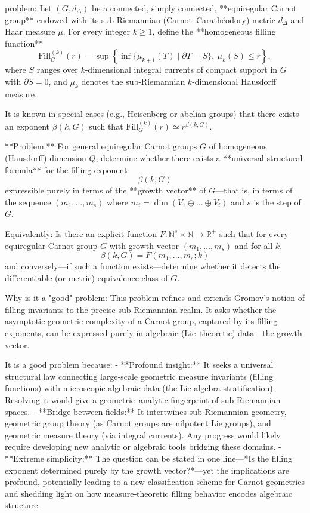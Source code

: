 problem:  
Let \((G, d_{\Delta})\) be a connected, simply connected, **equiregular Carnot group** endowed with its sub‑Riemannian (Carnot–Carathéodory) metric \(d_{\Delta}\) and Haar measure \(\mu\). For every integer \(k \ge 1\), define the **homogeneous filling function**  
\[
\mathrm{Fill}_{G}^{(k)}(r)=\sup\left\{ \inf\{ \mu_{k+1}(T)\mid \partial T=S \},\ \mu_k(S)\le r \right\},
\]  
where \(S\) ranges over \(k\)-dimensional integral currents of compact support in \(G\) with \(\partial S=0\), and \(\mu_k\) denotes the sub‑Riemannian \(k\)-dimensional Hausdorff measure.  

It is known in special cases (e.g., Heisenberg or abelian groups) that there exists an exponent \(\beta(k,G)\) such that \(\mathrm{Fill}_G^{(k)}(r) \simeq r^{\beta(k,G)}\).  

**Problem:**  
For general equiregular Carnot groups \(G\) of homogeneous (Hausdorff) dimension \(Q\), determine whether there exists a **universal structural formula** for the filling exponent  
\[
\beta(k,G)
\]  
expressible purely in terms of the **growth vector** of \(G\)—that is, in terms of the sequence \((m_1,\dots,m_s)\) where \(m_i = \dim(V_1\oplus\dots\oplus V_i)\) and \(s\) is the step of \(G\).  

Equivalently:  
Is there an explicit function \(F: \mathbb{N}^s \times \mathbb{N}\to \mathbb{R}^+\) such that for every equiregular Carnot group \(G\) with growth vector \((m_1,\dots,m_s)\) and for all \(k\),
\[
\beta(k,G)=F(m_1,\dots,m_s;k)
\]
and conversely—if such a function exists—determine whether it detects the differentiable (or metric) equivalence class of \(G\).  

Why is it a "good" problem:  
This problem refines and extends Gromov’s notion of filling invariants to the precise sub‑Riemannian realm. It asks whether the asymptotic geometric complexity of a Carnot group, captured by its filling exponents, can be expressed purely in algebraic (Lie–theoretic) data—the growth vector.  

It is a good problem because:  
- **Profound insight:** It seeks a universal structural law connecting large‑scale geometric measure invariants (filling functions) with microscopic algebraic data (the Lie algebra stratification). Resolving it would give a geometric–analytic fingerprint of sub‑Riemannian spaces.  
- **Bridge between fields:** It intertwines sub‑Riemannian geometry, geometric group theory (as Carnot groups are nilpotent Lie groups), and geometric measure theory (via integral currents). Any progress would likely require developing new analytic or algebraic tools bridging these domains.  
- **Extreme simplicity:** The question can be stated in one line—*Is the filling exponent determined purely by the growth vector?*—yet the implications are profound, potentially leading to a new classification scheme for Carnot geometries and shedding light on how measure‑theoretic filling behavior encodes algebraic structure.